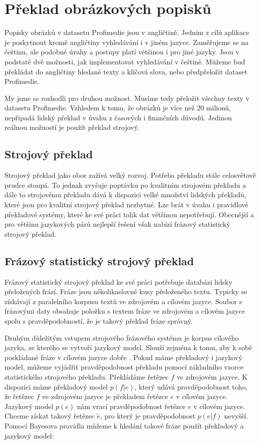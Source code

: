 \chapter{Překlad obrázkových popisků}
\label{chap:preklad}

Popisky obrázků v datasetu Profimedie jsou v angličtině. Jedním z cílů aplikace je poskytnout kromě angličtiny vyhledávání i v jiném jazyce. Zaměřujeme se na češtinu, ale podobné úvahy a postupy platí většinou i pro jiné jazyky. Jsou v podstatě dvě možnosti, jak implementovat vyhledávání v češtině. Můžeme buď překládat do angličtiny hledané texty a klíčová slova, nebo předpřeložit dataset Profimedie.

My jsme se rozhodli pro druhou možnost. Musíme tedy přeložit všechny texty v datasetu Profimedie. Vzhledem k tomu, že obrázků je více než 20 milionů, nepřipadá lidský překlad v úvahu z časových i finančních důvodů. Jedinou reálnou možností je použít překlad strojový.

\section{Strojový překlad}

Strojový překlad jako obor zažívá velký rozvoj. Potřeba překladu stále celosvětově prudce stoupá. To jednak zvyšuje poptávku po kvalitním strojovém překladu a dále to strojovému překladu dává k dispozici velké množství lidských překladů, které jsou pro kvalitní strojový překlad nezbytné. Lze brát v úvahu i pravidlové překladové systémy, které ke své práci tolik dat většinou nepotřebují. Obecnější a pro většinu jazykových párů nejlepší řešení však nabízí frázový statistický strojový překlad.

\section{Frázový statistický strojový překlad}

 Frázový statistický strojový překlad\cite{koehn} ke své práci potřebuje databázi lidsky přeložených frází. Fráze jsou několikaslovné kusy přeloženého textu. Typicky se získávají z paralelního korpusu textů ve zdrojovém a cílovém jazyce. Soubor s frázovými daty obsahuje položku s textem fráze ve zdrojovém a cílovém jazyce spolu s pravděpodobností, že je takový překlad fráze správný.

Druhým důležitým vstupem strojového frázového systému je korpus cílového jazyka, ze kterého se vytvoří jazykový model. Slouží zejména k tomu, aby k sobě poskládané fráze v cílovém jazyce dobře . Pokud máme překladový i jazykový model, můžeme vyjádřit pravděpodobnost překladu pomocí základního vzorce statistického strojového překladu. Překládáme řetězec $f$ ve zdrojovém jazyce. K dispozici máme překladový model $p(f|e)$, který udává pravděpodobnost toho, že řetězec $f$ ve zdrojovém jazyce je překladem řetězce $e$ v cílovém jazyce. Jazykový model $p(e)$ nám vrací pravděpodobnost řetězce $e$ v cílovém jazyce. Chceme získat takový řetězec $\tilde{e}$, pro který je pravděpodobnost $p(e|f)$ nevyšší. Pomocí Bayesova pravidla můžeme k hledání takové fráze použít překladový a jazykový model:

